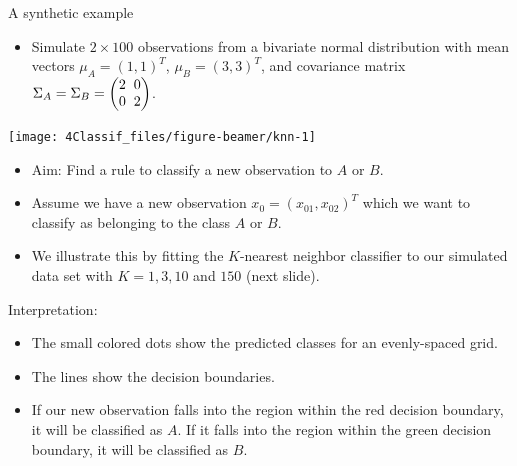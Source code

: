 \documentclass[10pt,ignorenonframetext,]{beamer}
\providecommand{\tightlist}{%
  \setlength{\itemsep}{0pt}\setlength{\parskip}{0pt}}
\begin{document}
\begin{frame}

\begin{block}{A synthetic example}

\begin{itemize}
\tightlist
\item
  Simulate \(2\times 100\) observations from a bivariate normal
  distribution with mean vectors \(\mu_A = (1, 1)^T\),
  \(\mu_B = (3, 3)^T\), and covariance matrix
  \(\Sigma_A = \Sigma_B = \begin{pmatrix} 2\hspace{2mm} 0 \\ 0 \hspace{2mm} 2 \end{pmatrix}\).
\end{itemize}

\begin{center}\texttt{[image: 4Classif\_files/figure-beamer/knn-1]} \end{center}

\begin{itemize}
\tightlist
\item
  Aim: Find a rule to classify a new observation to \(A\) or \(B\).
\end{itemize}

\end{block}

\end{frame}

\begin{frame}

\begin{itemize}
\item
  Assume we have a new observation \(x_0 = (x_{01}, x_{02})^T\) which we
  want to classify as belonging to the class \(A\) or \(B\).
\item
  We illustrate this by fitting the \(K\)-nearest neighbor classifier to
  our simulated data set with \(K = 1, 3, 10\) and \(150\) (next slide).
\end{itemize}

\vspace{4mm}

Interpretation:

\begin{itemize}
\tightlist
\item
  The small colored dots show the predicted classes for an evenly-spaced
  grid.
\item
  The lines show the decision boundaries.
\item
  If our new observation falls into the region within the red decision
  boundary, it will be classified as \(A\). If it falls into the region
  within the green decision boundary, it will be classified as \(B\).
\end{itemize}

\end{frame}
\end{document}
